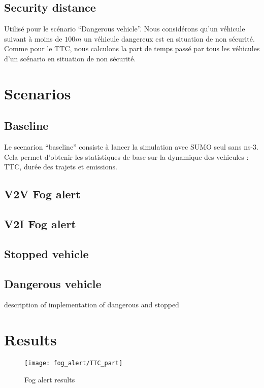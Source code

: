 \documentclass[a4paper,10pt]{report}
\begin{document}
\subsection*{Security distance}

Utilisé pour le scénario ``Dangerous vehicle''. Nous considérons qu'un véhicule suivant à moins de $100 m$ un véhicule dangereux est en situation de non sécurité. Comme pour le TTC, nous calculons la part de temps passé par tous les véhicules d'un scénario en situation de non sécurité.

\section*{Scenarios}

\subsection*{Baseline}

Le scenarion ``baseline'' consiste à lancer la simulation avec SUMO seul sans ns-3. Cela permet d'obtenir les statistiques de base sur la dynamique des vehicules : TTC, durée des trajets et emissions.

\subsection*{V2V Fog alert}


\subsection*{V2I Fog alert}

\subsection*{Stopped vehicle}

\subsection*{Dangerous vehicle}


description of implementation of dangerous and stopped

\section*{Results}

\begin{figure}
    \begin{center}
         \texttt{[image: fog\_alert/TTC\_part]}
    \end{center}
  \caption{ Fog alert results}
  \label{fig:ttc_part}
\end{figure}
\end{document}
